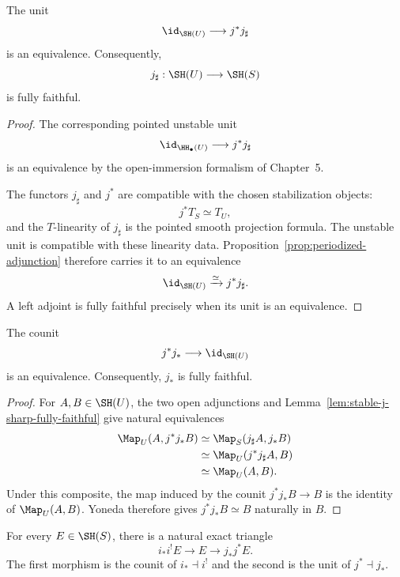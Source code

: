 \begin{lemma}
\label{lem:stable-j-sharp-fully-faithful}
The unit
\[
    \id_{\SH(U)}
    \longrightarrow
    j^*j_\sharp
\]
is an equivalence.  Consequently,
\[
    j_\sharp:\SH(U)\longrightarrow\SH(S)
\]
is fully faithful.
\end{lemma}

\begin{proof}
The corresponding pointed unstable unit
\[
    \id_{\HH_\bullet(U)}
    \longrightarrow
    j^*j_\sharp
\]
is an equivalence by the open-immersion formalism of Chapter~5.

The functors \(j_\sharp\) and \(j^*\) are compatible with the chosen
stabilization objects:
\[
    j^*T_S\simeq T_U,
\]
and the \(T\)-linearity of \(j_\sharp\) is the pointed smooth projection
formula.  The unstable unit is compatible with these linearity data.
Proposition~\ref{prop:periodized-adjunction} therefore carries it to an
equivalence
\[
    \id_{\SH(U)}
    \xrightarrow{\simeq}
    j^*j_\sharp.
\]
A left adjoint is fully faithful precisely when its unit is an equivalence.
\end{proof}

\begin{proposition}
\label{prop:stable-open-direct-image-fully-faithful}
The counit
\[
    j^*j_*\longrightarrow\id_{\SH(U)}
\]
is an equivalence.  Consequently, $j_*$ is fully faithful.
\end{proposition}

\begin{proof}
For $A,B\in\SH(U)$, the two open adjunctions and Lemma~\ref{lem:stable-j-sharp-fully-faithful} give natural
equivalences
\[
\begin{aligned}
    \Map_U(A,j^*j_*B)
    &\simeq
    \Map_S(j_\sharp A,j_*B) \\
    &\simeq
    \Map_U(j^*j_\sharp A,B) \\
    &\simeq
    \Map_U(A,B).
\end{aligned}
\]
Under this composite, the map induced by the counit $j^*j_*B\to B$ is the identity of
$\Map_U(A,B)$.  Yoneda therefore gives $j^*j_*B\simeq B$ naturally in $B$.
\end{proof}

\begin{theorem}
\label{thm:stable-colocalization}
For every $E\in\SH(S)$, there is a natural exact triangle
\[
    i_*i^!E
    \longrightarrow
    E
    \longrightarrow
    j_*j^*E.
\]
The first morphism is the counit of $i_*\dashv i^!$ and the second is the unit of
$j^*\dashv j_*$.
\end{theorem}


